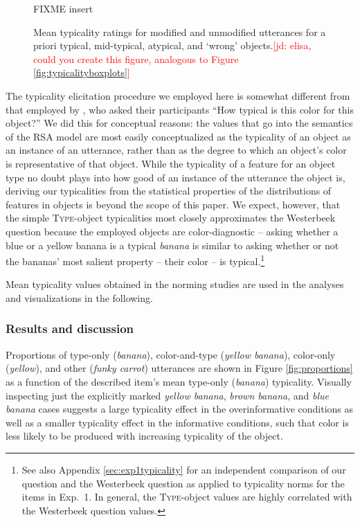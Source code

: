 \documentclass[11pt]{article}
\newcommand{\jd}[1]{\textcolor{Red}{[jd: #1]}}
\newcommand{\figref}[1]{Figure \ref{#1}}
\newcommand{\appref}[1]{Appendix \ref{#1}}
\begin{document}
\begin{figure}
FIXME insert
\caption{Mean typicality ratings for modified and unmodified utterances for a priori typical, mid-typical, atypical, and `wrong' objects.\jd{elisa, could you create this figure, analogous to \figref{fig:typicalityboxplots}}}
\label{fig:exp2colortypicalitymeans}
\end{figure}

The typicality elicitation procedure we employed here is somewhat different from that employed by , who asked their participants ``How typical is this color for this object?'' We did this for conceptual reasons: the values that go into the semantics of the RSA model are most easily conceptualized as the typicality of an object as an instance of an utterance, rather than as the degree to which an object's color is representative of that object. While the typicality of a feature for an object type no doubt plays into how good of an instance of the utterance the object is, deriving our typicalities from the  statistical properties of the distributions of features in objects is beyond the scope of this paper. We expect, however, that the simple \textsc{Type}-object typicalities most closely approximates the Westerbeek question because the employed objects are color-diagnostic -- asking whether a blue or a yellow banana is a typical \textit{banana} is similar to asking whether or not the bananas' most salient property -- their color -- is typical.\footnote{See also \appref{sec:exp1typicality} for an independent comparison of our question and the Westerbeek question as applied to typicality norms for the items in Exp.~1. In general, the \textsc{Type}-object values are highly correlated with the Westerbeek question values.} 

Mean typicality values obtained in the norming studies are used in the analyses and visualizations in the following.

\subsubsection{Results and discussion}

Proportions of type-only (\emph{banana}), color-and-type (\emph{yellow banana}), color-only (\emph{yellow}), and other (\emph{funky carrot}) utterances are shown in \figref{fig:proportions} as a function of the described item's mean type-only (\emph{banana}) typicality. Visually inspecting just the explicitly marked \emph{yellow banana}, \emph{brown banana}, and \emph{blue banana} cases suggests a large typicality effect in the overinformative conditions as well as a smaller typicality effect in the informative conditions, such that color is less likely to be produced with increasing typicality of the object. 
\end{document}
